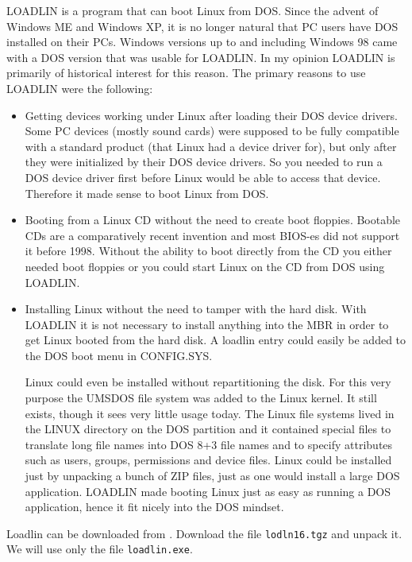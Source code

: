 \documentclass[12pt,a4paper]{article}
\begin{document}
LOADLIN is a program that can boot Linux from DOS. Since the advent of
Windows ME and Windows XP, it is no longer natural that PC users have
DOS installed on their PCs. Windows versions up to and including
Windows 98 came with a DOS version that was usable for LOADLIN. In my
opinion LOADLIN is primarily of historical interest for this
reason. The primary reasons to use LOADLIN were the following:
\begin{itemize}
\item Getting devices working under Linux after loading their DOS
  device drivers. Some PC devices (mostly sound cards) were supposed
  to be fully compatible with a standard product (that Linux had a
  device driver for), but only after they were initialized by their
  DOS device drivers. So you needed to run a DOS device driver first
  before Linux would be able to access that device. Therefore it made
  sense to boot Linux from DOS.
\item Booting from a Linux CD without the need to create boot
  floppies. Bootable CDs are a comparatively recent invention and most
  BIOS-es did not support it before 1998. Without the ability to boot
  directly from the CD you either needed boot floppies or you could
  start Linux on the CD from DOS using LOADLIN.
\item Installing Linux without the need to tamper with the hard
  disk. With LOADLIN it is not necessary to install anything into the
  MBR in order to get Linux booted from the hard disk. A loadlin entry
  could easily be added to the DOS boot menu in CONFIG.SYS. 

  Linux could even be installed without repartitioning the disk.
  For this very purpose the UMSDOS file system was added to the
  Linux kernel. It still exists, though it sees very little usage
  today. The Linux file systems lived in the LINUX directory on the
  DOS partition and it contained special files to translate long file
  names into DOS 8+3 file names and to specify attributes such as
  users, groups, permissions and device files. Linux could be
  installed just by unpacking a bunch of ZIP files, just as one would
  install a large DOS application. LOADLIN made booting Linux just as easy
  as running a DOS application, hence it fit nicely into the DOS
  mindset.
\end{itemize}

Loadlin can be downloaded from
.
Download the file {\tt lodln16.tgz} and unpack it. We will use only
the file {\tt loadlin.exe}.
\end{document}
